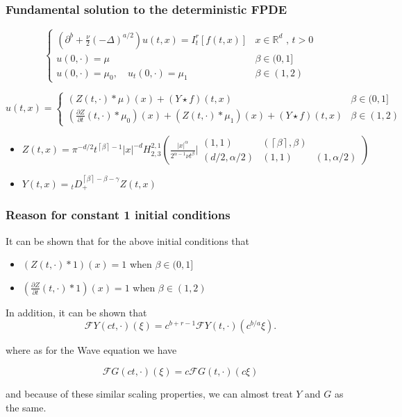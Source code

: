 \documentclass[11pt]{beamer}
\numberwithin{equation}{section}
\newcommand{\Ceil}[1]{\left\lceil #1 \right\rceil}
\newcommand{\R}{\mathbb{R}}
\begin{document}
\begin{frame}[t]
	\frametitle{Fundamental solution to the deterministic FPDE}
		\begin{equation}
	\begin{cases}
	\left(\partial^b + \frac{\nu}{2}(-\Delta)^{a/2}\right)u(t,x) = I^r_t \left[f(t,x) \right] & \text{$x\in \R^d$ , $t>0$} \\
	u(0,\cdot) = \mu                                                                                           & \beta \in (0,1]            \\
	u(0,\cdot) = \mu_0, \quad u_t(0,\cdot) = \mu_1                                                                  & \beta \in (1,2)
	\end{cases}  \label{fpde}
	\end{equation}
	
	\[
	u(t,x) = \begin{cases} 
	(Z(t,\cdot)*\mu)(x)  + (Y \star f)(t,x)   &   \beta \in (0,1]\\
	(\frac{\partial Z}{\partial t}(t,\cdot)*\mu_0)(x) + 	(Z(t,\cdot)*\mu_1)(x) + (Y \star f)(t,x) & \beta \in (1,2)
	\end{cases}	
	\]
\begin{itemize}
	\item $ Z(t,x) = \pi^{-d/2}t^{\Ceil{\beta} -1}|x|^{-d} H^{2,1}_{2,3}\left(\frac{|x|^\alpha}{2^{\alpha -1} \nu t^\beta} \bigg\vert \begin{matrix} (1,1) & (\Ceil{\beta}, \beta)
	\\ (d/2,\alpha/2) & (1,1) & (1,\alpha /2 )\end{matrix} \right) $
	
	\item $Y(t,x) = {}_{t}D_{+}^{\Ceil{\beta}-\beta-\gamma}Z(t,x)$
\end{itemize}	
	
\end{frame}

\begin{frame}[t]
	\frametitle{Reason for constant 1 initial conditions}
	
	It can be shown that for the above initial conditions that 
	
	\begin{itemize}
		\item 	$(Z(t,\cdot)*1)(x) = 1$ when $\beta \in (0,1]$
		\item  $ (\frac{\partial Z}{\partial t}(t,\cdot)*1)(x) =1$ when $\beta \in (1,2) $
	\end{itemize}

In addition, it can be shown that 
\[
	\mathcal{F}Y(ct,\cdot)(\xi) = c^{b+r -1}\mathcal{F}Y(t,\cdot)(c^{b/a} \xi). 
\]

where as for the Wave equation we have 

\[
	\mathcal{F}G(ct, \cdot)(\xi) = c \mathcal{F}G(t,\cdot)(c\xi) 
\]

and because of these similar scaling properties, we can almost treat $Y$ and $G$ as the same. 
\end{frame}
\end{document}
